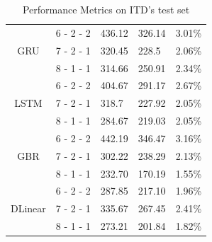 \documentclass{ieeeojies}
\begin{document}
\begin{table}[H]
\begin{tabular}{|c|c|p{1cm}|p{1cm}|p{1cm}|}
        \hline
        \multirow{3}{*}{GRU}
                       & 6 - 2 - 2               & 436.12        & 326.14       & 3.01\%        \\
        \cline{2-5}
                       & 7 - 2 - 1               & 320.45        & 228.5        & 2.06\%        \\
        \cline{2-5}
                       & 8 - 1 - 1               & 314.66        & 250.91       & 2.34\%        \\
        \hline
        \multirow{3}{*}{LSTM}
                       & 6 - 2 - 2               & 404.67        & 291.17       & 2.67\%        \\
        \cline{2-5}
                       & 7 - 2 - 1               & 318.7         & 227.92       & 2.05\%        \\
        \cline{2-5}
                       & 8 - 1 - 1               & 284.67        & 219.03       & 2.05\%        \\
        \hline
        \multirow{3}{*}{GBR}
                       & 6 - 2 - 2               & 442.19        & 346.47       & 3.16\%        \\
        \cline{2-5}
                       & 7 - 2 - 1               & 302.22        & 238.29       & 2.13\%        \\
        \cline{2-5}
                       & 8 - 1 - 1               & 232.70        & 170.19       & 1.55\%        \\
        \hline
        \multirow{3}{*}{DLinear}
                       & 6 - 2 - 2               & 287.85        & 217.10       & 1.96\%        \\
        \cline{2-5}
                       & 7 - 2 - 1               & 335.67        & 267.45       & 2.41\%        \\
        \cline{2-5}
                       & 8 - 1 - 1               & 273.21        & 201.84       & 1.82\%        \\
        \hline
    \end{tabular}
    \caption{Performance Metrics on ITD's test set}
    \label{tab:performance_metrics_itd}
\end{table}
\end{document}
